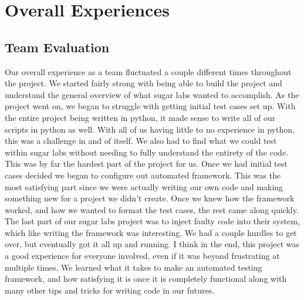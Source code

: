 \documentclass{article}
\begin{document}
\section{Overall Experiences}
\subsection{Team Evaluation}
Our overall experience as a team fluctuated a couple different times throughout the project. We started fairly strong with being able to build the project and understand the general overview of what sugar labs wanted to accomplish. As the project went on, we began to struggle with getting initial test cases set up. With the entire project being written in python, it made sense to write all of our scripts in python as well. With all of us having little to no experience in python, this was a challenge in and of itself. We also had to find what we could test within sugar labs without needing to fully understand the entirety of the code. This was by far the hardest part of the project for us. Once we had initial test cases decided we began to configure out automated framework. This was the most satisfying part since we were actually writing our own code and making something new for a project we didn’t create. Once we knew how the framework worked, and how we wanted to format the test cases, the rest came along quickly. The last part of our sugar labs project was to inject faulty code into their system, which like writing the framework was interesting. We had a couple hurdles to get over, but eventually got it all up and running. I think in the end, this project was a good experience for everyone involved, even if it was beyond frustrating at multiple times. We learned what it takes to make an automated testing framework, and how satisfying it is once it is completely functional along with many other tips and tricks for writing code in our futures. 
\end{document}
